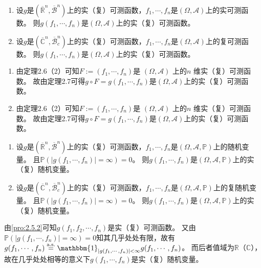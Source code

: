 \documentclass{ctexart}
\begin{document}
\begin{problem}\label{pro:2.5.2}
  \begin{enumerate}
    \item   设\(g \)是\((\overline{\mathbb{R}}^n,\overline{\mathcal{B}}^n) \)上的实（复）可测函数，\(f_1,\cdots,f_n \)是\((\Omega,\mathcal{A}) \)上的实可测函数。
      则\(g(f_1,\cdots,f_n) \)是\((\Omega,\mathcal{A}) \)上的实（复）可测函数。
    \item   设\(g \)是\((\overline{\mathbb{C}}^n,\overline{\mathcal{B}}^n_c) \)上的实（复）可测函数，\(f_1,\cdots,f_n \)是\((\Omega,\mathcal{A}) \)上的复可测函数。
      则\(g(f_1,\cdots,f_n) \)是\((\Omega,\mathcal{A}) \)上的实（复）可测函数。
  \end{enumerate}
\end{problem}
\begin{solution}
  \begin{enumerate}
    \item
      由定理2.6（2）可知\(F:=(f_1,\cdots,f_n) \)是{ \((\Omega,\mathcal{A}) \) }上的\(n \) 维{实（复）可测函数}。
      故由定理2.7可得\(g \circ F=g(f_1,\cdots,f_n) \)是\((\Omega,\mathcal{A}) \)上的{实（复）可测函数}。
    \item
      由定理2.6（2）可知\(F:=(f_1,\cdots,f_n) \)是{ \((\Omega,\mathcal{A}) \) }上的\(n \) 维{实（复）可测函数}。
      故由定理2.7可得\(g \circ F=g(f_1,\cdots,f_n) \)是\((\Omega,\mathcal{A}) \)上的{实（复）可测函数}。
  \end{enumerate}

\end{solution}

\begin{problem}\label{pro:2.5.3}
  \begin{enumerate}
    \item   设\(g \)是\((\overline{\mathbb{R}}^n,\overline{\mathcal{B}}^n) \)上的实（复）可测函数，\(f_1,\cdots,f_n \)是\((\Omega,\mathcal{A},\mathbb{P}) \)上的随机变量。
      且\(\mathbb{P}(|g(f_1,\cdots,f_n)|=\infty)=0 \)。 则\(g(f_1,\cdots,f_n) \)是\((\Omega,\mathcal{A},\mathbb{P} ) \)上的实（复）随机变量。
    \item   设\(g \)是\((\overline{\mathbb{C}}^n,\overline{\mathcal{B}}^n_c) \)上的实（复）可测函数，\(f_1,\cdots,f_n \)是\((\Omega,\mathcal{A},\mathbb{P}) \)上的复随机变量。
      且\(\mathbb{P}(|g(f_1,\cdots,f_n)|=\infty)=0 \)。 则\(g(f_1,\cdots,f_n) \)是\((\Omega,\mathcal{A},\mathbb{P} ) \)上的实（复）随机变量。
  \end{enumerate}
\end{problem}
\begin{solution}
  由\ref{pro:2.5.2}可知\(g(f_1,f_2,\cdots,f_n) \)是实（复）可测函数。
  又由\(\mathbb{P}(|g(f_1,\cdots,f_n)|=\infty)=0 \)知其几乎处处有限，故有\(g(f_1,\cdots,f_n) \overset{\text{a.s.}}{=} \mathbbm{1}_{|g(f_1,\cdots,f_n)|<\infty}g(f_1,\cdots,f_n) \)。
  而后者值域为\(\mathbb{R} \)（\(\mathbb{C} \)），故在几乎处处相等的意义下\(g(f_1,\cdots,f_n) \)是实（复）随机变量。
\end{solution}
\end{document}

